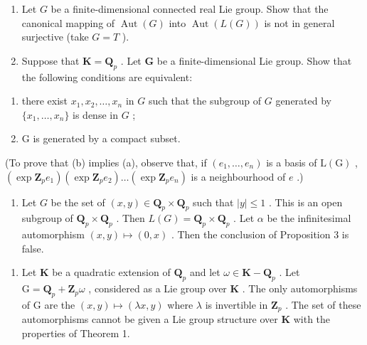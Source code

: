 
\begin{enumerate}
\def\labelenumi{\arabic{enumi}.}
\item
  Let \(G\) be a finite-dimensional connected real Lie group. Show that the canonical mapping of \(\operatorname{Aut}(G)\) into \(\operatorname{Aut}(L(G))\) is not in general surjective (take \(G = T\) ).
\item
  Suppose that \(\mathbf{K} = \mathbf{Q}_p\) . Let \(\mathbf{G}\) be a finite-dimensional Lie group. Show that the following conditions are equivalent:
\end{enumerate}

\begin{enumerate}
\def\labelenumi{(\alph{enumi})}
\item
  there exist \(x_{1}, x_{2}, \ldots, x_{n}\) in \(G\) such that the subgroup of \(G\) generated by \(\{x_{1}, \ldots, x_{n}\}\) is dense in \(G\) ;
\item
  G is generated by a compact subset.
\end{enumerate}

(To prove that (b) implies (a), observe that, if \((e_1, \ldots, e_n)\) is a basis of \(\mathrm{L}(\mathrm{G})\) , \((\exp \mathbf{Z}_p e_1)(\exp \mathbf{Z}_p e_2) \ldots (\exp \mathbf{Z}_p e_n)\) is a neighbourhood of \(e\) .)

\begin{enumerate}
\def\labelenumi{\arabic{enumi}.}
\setcounter{enumi}{2}
\tightlist
\item
  Let \(G\) be the set of \((x, y) \in \mathbf{Q}_p \times \mathbf{Q}_p\) such that \(|y| \leqslant 1\) . This is an open subgroup of \(\mathbf{Q}_p \times \mathbf{Q}_p\) . Then \(L(G) = \mathbf{Q}_p \times \mathbf{Q}_p\) . Let \(\alpha\) be the infinitesimal automorphism \((x, y) \mapsto (0, x)\) . Then the conclusion of Proposition 3 is false.
\end{enumerate}

\begin{enumerate}
\def\labelenumi{(\arabic{enumi})}
\setcounter{enumi}{3}
\tightlist
\item
  Let \(\mathbf{K}\) be a quadratic extension of \(\mathbf{Q}_p\) and let \(\omega \in \mathbf{K} - \mathbf{Q}_p\) . Let \(\mathrm{G} = \mathbf{Q}_p + \mathbf{Z}_p\omega\) , considered as a Lie group over \(\mathbf{K}\) . The only automorphisms of \(\mathrm{G}\) are the \((x,y)\mapsto (\lambda x,y)\) where \(\lambda\) is invertible in \(\mathbf{Z}_p\) . The set of these automorphisms cannot be given a Lie group structure over \(\mathbf{K}\) with the properties of Theorem 1.
\end{enumerate}

